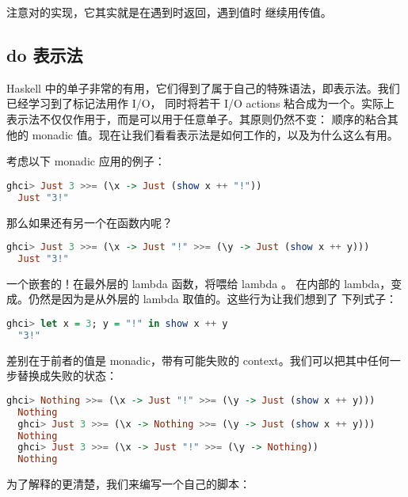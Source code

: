 \documentclass[./main.tex]{subfiles}
\begin{document}
注意对\acode{>>=}的实现，它其实就是在遇到时返回，遇到值时
继续用传值。

\subsection*{do 表示法}

Haskell 中的单子非常的有用，它们得到了属于自己的特殊语法，即表示法。我们已经学习到了标记法用作 I/O，
同时将若干 I/O actions 粘合成为一个。实际上表示法不仅仅作用于，而是可以用于任意单子。其原则仍然不变：
顺序的粘合其他的 monadic 值。现在让我们看看表示法是如何工作的，以及为什么这么有用。

考虑以下 monadic 应用的例子：

\begin{lstlisting}[language=Haskell]
  ghci> Just 3 >>= (\x -> Just (show x ++ "!"))
  Just "3!"
\end{lstlisting}

那么如果还有另一个\acode{>>=}在函数内呢？

\begin{lstlisting}[language=Haskell]
  ghci> Just 3 >>= (\x -> Just "!" >>= (\y -> Just (show x ++ y)))
  Just "3!"
\end{lstlisting}

一个嵌套的\acode{>>=}！在最外层的 lambda 函数，将喂给 lambda 。
在内部的 lambda，变成。仍然是因为是从外层的 lambda 取值的。这些行为让我们想到了
下列式子：

\begin{lstlisting}[language=Haskell]
  ghci> let x = 3; y = "!" in show x ++ y
  "3!"
\end{lstlisting}

差别在于前者的值是 monadic，带有可能失败的 context。我们可以把其中任何一步替换成失败的状态：

\begin{lstlisting}[language=Haskell]
  ghci> Nothing >>= (\x -> Just "!" >>= (\y -> Just (show x ++ y)))
  Nothing
  ghci> Just 3 >>= (\x -> Nothing >>= (\y -> Just (show x ++ y)))
  Nothing
  ghci> Just 3 >>= (\x -> Just "!" >>= (\y -> Nothing))
  Nothing
\end{lstlisting}

为了解释的更清楚，我们来编写一个自己的脚本：
\end{document}
